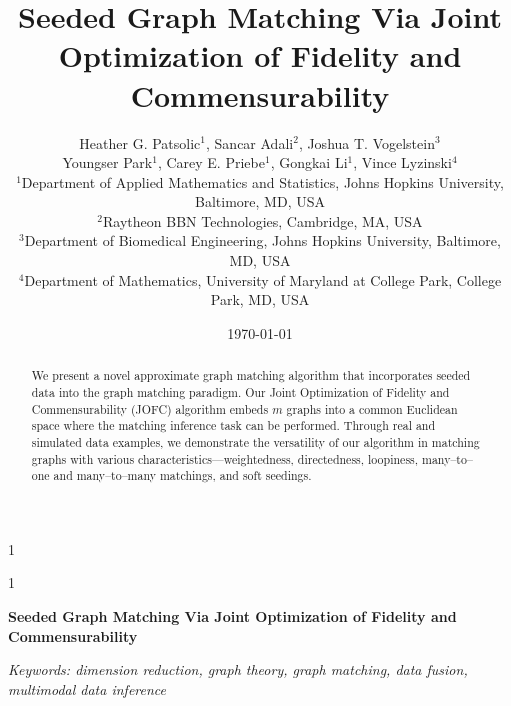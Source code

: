 \documentclass[12pt]{article}
\newcommand{\blind}{1}
\numberwithin{equation}{section}
\theoremstyle{definition}
\begin{document}
%

\def\spacingset#1{\renewcommand{\baselinestretch}%
{#1}\small\normalsize} \spacingset{1}



\blind
{
  \title
  {Seeded Graph Matching Via Joint Optimization of Fidelity and Commensurability}
  \author{Heather G. Patsolic$^{1}$,
      Sancar Adali$^{2}$, Joshua T. Vogelstein$^{3}$\\
      Youngser Park$^{1}$, Carey E. Priebe$^{1}$, 
      Gongkai Li$^{1}$, Vince Lyzinski$^{4}$  \\
  \small{$^{1}$Department of Applied Mathematics and Statistics, Johns Hopkins University, Baltimore, MD, USA}\\
  \small{$^{2}$Raytheon BBN Technologies, Cambridge, MA, USA}\\
  \small{$^{3}$Department of Biomedical Engineering, Johns Hopkins University, Baltimore, MD, USA}\\
  \small{$^{4}$Department of Mathematics, University of Maryland
      at College Park, College Park, MD, USA}}
  \date{\today}
  \maketitle
} \fi

\blind
{
  \bigskip
  \bigskip
  \bigskip
  \begin{center}
    {\LARGE\bf Seeded Graph Matching Via Joint Optimization of Fidelity and Commensurability}
\end{center}
  \medskip
} \fi

\bigskip
\begin{abstract}
  We present a novel approximate graph matching algorithm that incorporates seeded data into the graph matching paradigm.  Our Joint Optimization of Fidelity and Commensurability (JOFC) algorithm embeds $m$ graphs into a common Euclidean space where the matching inference task can be performed.  Through real and simulated data examples, we demonstrate the versatility of our algorithm in matching graphs with various characteristics---weightedness, directedness, loopiness, many--to--one and many--to--many matchings, and soft seedings.
\end{abstract}

\noindent%
{\it Keywords: dimension reduction, graph theory, graph matching, data fusion, multimodal data inference}  
\vfill
\end{document}

